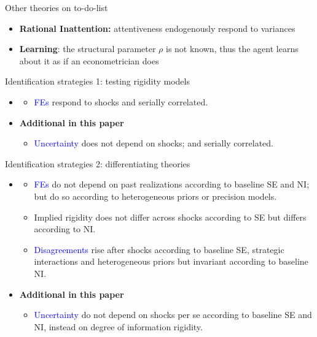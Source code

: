 \documentclass{beamer}
\begin{document}
\begin{frame}{Other theories on to-do-list}
\begin{itemize}
	\item \textbf{Rational Inattention:} attentiveness endogenously respond to variances
	\item \textbf{Learning}: the structural parameter $\rho$ is not known, thus the agent learns about it as if an econometrician does
\end{itemize}
\end{frame}

\begin{frame}{Identification strategies 1: testing rigidity models}

\begin{itemize}
	\item \citet{coibion2012can}
	\begin{itemize}
		\item \textcolor{blue}{FEs} respond to shocks and serially correlated. 
	\end{itemize}
	\item \textbf{Additional in this paper}
	\begin{itemize}
		\item \textcolor{blue}{Uncertainty} does not depend on shocks; and serially correlated. 
	\end{itemize}
\end{itemize}

\end{frame}

\begin{frame}{Identification strategies 2: differentiating theories}
\begin{itemize}
	\item \citet{coibion2012can}
	\begin{itemize}
		\item \textcolor{blue}{FEs} do not depend on past realizations according to baseline SE and NI; but do so according to heterogeneous priors or precision models. 
		\item Implied rigidity does not differ across shocks according to SE but differs according to NI. 
		\item \textcolor{blue}{Disagreements} rise after shocks according to baseline SE, strategic interactions and heterogeneous priors but invariant according to baseline NI.
	\end{itemize}
	\item \textbf{Additional in this paper}
	\begin{itemize}
		\item \textcolor{blue}{Uncertainty} do not depend on shocks per se according to baseline SE and NI, instead on degree of information rigidity.
	\end{itemize}
\end{itemize}

\end{frame}
\end{document}
